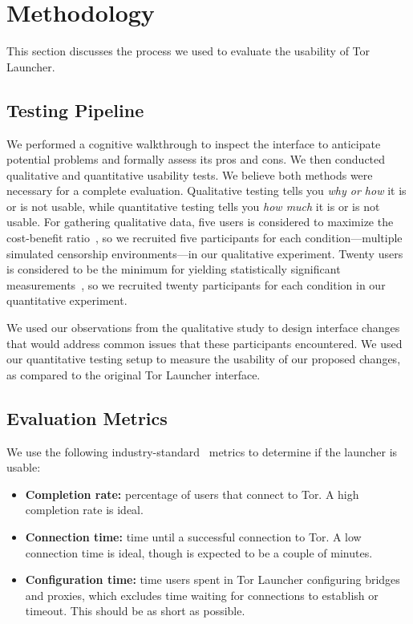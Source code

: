 \documentclass[USenglish,oneside,twocolumn]{article}
\begin{document}
\section{Methodology} 
This section discusses the process we used to evaluate the usability of Tor Launcher.

\subsection{Testing Pipeline} 
We performed a cognitive walkthrough to inspect the interface to anticipate potential problems and formally assess its pros and cons. We then conducted qualitative and quantitative usability tests. We believe both methods were necessary for a complete evaluation. Qualitative testing tells you {\it why or how} it is or is not usable, while quantitative testing tells you {\it how much} it is or is not usable. For gathering qualitative data, five users is considered to maximize the cost-benefit ratio~\cite{howmanyusers}, so we recruited five participants for each condition---multiple simulated censorship environments---in our qualitative experiment. Twenty users is considered to be the minimum for yielding statistically significant measurements~\cite{howmanyusers}, so we recruited twenty participants for each condition in our quantitative experiment.

We used our observations from the qualitative study to design interface changes that would address common issues that these participants encountered. We used our quantitative testing setup to measure the usability of our proposed changes, as compared to the original Tor Launcher interface.

\subsection{Evaluation Metrics}
\label{sec:eval}
We use the following industry-standard~\cite{albert2013measuring} metrics to determine if the launcher is usable: \\

\begin{itemize}
\item {\bfseries Completion rate:}  percentage of users that connect to Tor. A high completion rate is ideal. 
\item {\bfseries Connection time:} time until a successful connection to Tor. A low connection time is ideal, though is expected to be a couple of minutes.
\item {\bfseries Configuration time:} time users spent in Tor Launcher configuring bridges and proxies, which excludes time waiting for connections to establish or timeout. This should be as short as possible.
\end{itemize}
\end{document}
